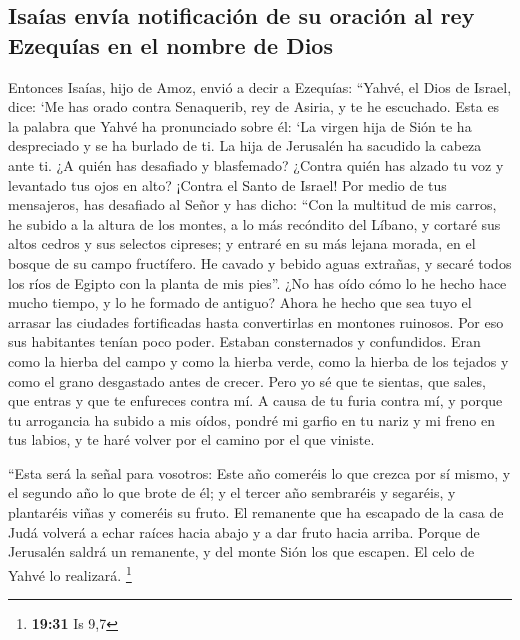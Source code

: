 \hypertarget{isauxedas-envuxeda-notificaciuxf3n-de-su-oraciuxf3n-al-rey-ezequuxedas-en-el-nombre-de-dios}{%
\subsection{Isaías envía notificación de su oración al rey Ezequías en
el nombre de
Dios}\label{isauxedas-envuxeda-notificaciuxf3n-de-su-oraciuxf3n-al-rey-ezequuxedas-en-el-nombre-de-dios}}

 Entonces Isaías, hijo de Amoz, envió a decir a Ezequías:
``Yahvé, el Dios de Israel, dice: `Me has orado contra Senaquerib, rey
de Asiria, y te he escuchado.  Esta es la palabra que
Yahvé ha pronunciado sobre él: `La virgen hija de Sión te ha despreciado
y se ha burlado de ti. La hija de Jerusalén ha sacudido la cabeza ante
ti.  ¿A quién has desafiado y blasfemado? ¿Contra quién
has alzado tu voz y levantado tus ojos en alto? ¡Contra el Santo de
Israel!  Por medio de tus mensajeros, has desafiado al
Señor y has dicho: ``Con la multitud de mis carros, he subido a la
altura de los montes, a lo más recóndito del Líbano, y cortaré sus altos
cedros y sus selectos cipreses; y entraré en su más lejana morada, en el
bosque de su campo fructífero.  He cavado y bebido aguas
extrañas, y secaré todos los ríos de Egipto con la planta de mis pies''.
 ¿No has oído cómo lo he hecho hace mucho tiempo, y lo he
formado de antiguo? Ahora he hecho que sea tuyo el arrasar las ciudades
fortificadas hasta convertirlas en montones ruinosos. 
Por eso sus habitantes tenían poco poder. Estaban consternados y
confundidos. Eran como la hierba del campo y como la hierba verde, como
la hierba de los tejados y como el grano desgastado antes de crecer.
 Pero yo sé que te sientas, que sales, que entras y que
te enfureces contra mí.  A causa de tu furia contra mí, y
porque tu arrogancia ha subido a mis oídos, pondré mi garfio en tu nariz
y mi freno en tus labios, y te haré volver por el camino por el que
viniste.

 ``Esta será la señal para vosotros: Este año comeréis lo
que crezca por sí mismo, y el segundo año lo que brote de él; y el
tercer año sembraréis y segaréis, y plantaréis viñas y comeréis su
fruto.  El remanente que ha escapado de la casa de Judá
volverá a echar raíces hacia abajo y a dar fruto hacia arriba.
 Porque de Jerusalén saldrá un remanente, y del monte
Sión los que escapen. El celo de Yahvé lo realizará. \footnote{\textbf{19:31}
  Is 9,7}

